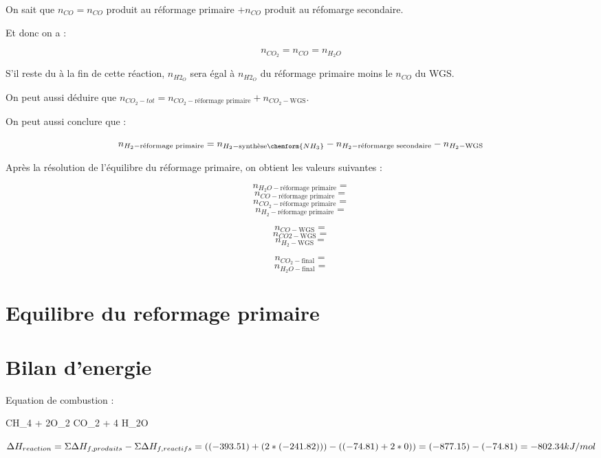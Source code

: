 \documentclass{article}
\begin{document}
On sait que $n_{CO} = n_{CO}$ produit au réformage primaire
$+ n_{CO}$ produit au réfomarge secondaire. 

Et donc on a : 

$$n_{CO_2} = n_{CO} = n_{H_2O}$$

S'il reste du  à la fin de cette réaction, $n_{H2_O}$ 
sera égal à $n_{H2_O}$ du réformage primaire moins le $n_{CO}$ du WGS.

On peut aussi déduire que $n_{CO_2-tot} = n_{{CO_2}-\text{réformage primaire}}
+ n_{{CO_2}-\text{WGS}}$.

On peut aussi conclure que : 

$$n_{H_2-\text{réformage primaire}}= n_{H_2-\text{synthèse} \chemform{NH_3}}
- n_{H_2-\text{réformarge secondaire}} - n_{H_2-\text{WGS}}$$

Après la résolution de l'équilibre du réformage primaire, 
on obtient les valeurs suivantes : 

$$n_{H_2O-\text{réformage primaire}} = $$
$$n_{CO-\text{réformage primaire}} = $$
$$n_{CO_2-\text{réformage primaire}} = $$
$$n_{H_2-\text{réformage primaire}} = $$

$$n_{CO-\text{WGS}} = $$
$$n_{CO2-\text{WGS}} = $$
$$n_{H_2-\text{WGS}} = $$

$$n_{CO_2-\text{final}} = $$ 
$$n_{H_2O-\text{final}} = $$

\section{Equilibre du reformage primaire}

\section{Bilan d'energie}
Equation de combustion :
\begin{chemmath}
	CH_4 + 2O_2 \Longrightarrow CO_2 + 4 H_2O
\end{chemmath}

$\Delta H_{reaction} 	= \Sigma \Delta H_{f,produits} - \Sigma \Delta H_{f,reactifs}\\
						= ((-393.51) + (2*(-241.82))) - ((-74.81) + 2*0))\\
						= (-877.15) - (-74.81)\\
						= -802.34 kJ/mol $
\end{document}
